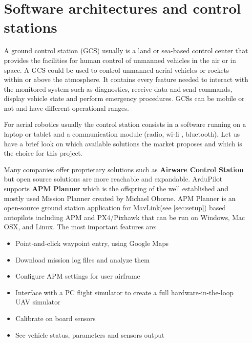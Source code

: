 \section{Software architectures and control stations}

A ground control station (GCS) usually is a land or sea-based control center that provides the facilities for human control of unmanned vehicles in the air or in space. A GCS could be used to control unmanned aerial vehicles or rockets within or above the atmosphere. It contains every feature needed to interact with the monitored system such as diagnostics, receive data and send commands, display vehicle state and perform emergency procedures. GCSs can be mobile or not and have different operational ranges. \par For aerial robotics usually the control station consists in a software running on a laptop or tablet and a communication module (radio, wi-fi , bluetooth). Let us have a brief look on which available solutions the market proposes and which is the choice for this project. \par 
Many companies offer proprietary solutions such as \textbf{Airware Control Station}  \cite{airware} but open source solutions are more reachable and expandable. ArduPilot supports \textbf{APM Planner} \cite{APMplan} which is the offspring of the well established and mostly used Mission Planner created by Michael Oborne. APM Planner is an open-source ground station application for MavLink(see \ref{sec:setup}) based autopilots including APM and PX4/Pixhawk that can be run on Windows, Mac OSX, and Linux. The most important features are: \begin{itemize}
\item Point-and-click waypoint entry, using Google Maps
\item Download mission log files and analyze them
\item Configure APM settings for user airframe
\item Interface with a PC flight simulator to create a full hardware-in-the-loop UAV simulator
\item Calibrate on board sensors
\item See vehicle status, parameters and sensors output

\end{itemize}
